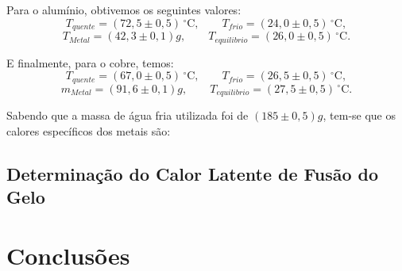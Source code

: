 \documentclass[12pt,a4paper]{article}
\begin{document}
Para o alumínio, obtivemos os seguintes valores:
$$ T_{quente} = (72,5 \pm 0,5)\,^{\circ}\mathrm{C}, \qquad T_{frio} = (24,0 \pm 0,5)\,^{\circ}\mathrm{C}, $$
$$ T_{Metal} = (42,3 \pm 0,1)g, \qquad T_{equilibrio} = (26,0 \pm 0,5)\,^{\circ}\mathrm{C}. $$


 E finalmente, para o cobre, temos:
$$ T_{quente} = (67,0 \pm 0,5)\,^{\circ}\mathrm{C}, \qquad T_{frio} = (26,5 \pm 0,5)\,^{\circ}\mathrm{C}, $$
$$ m_{Metal} = (91,6 \pm 0,1)g, \qquad T_{equilibrio} = (27,5 \pm 0,5)\,^{\circ}\mathrm{C}. $$

Sabendo que a massa de água fria utilizada foi de $(185 \pm 0,5)g$, tem-se que os calores específicos dos metais são:

\subsection{Determinação do Calor Latente de Fusão do Gelo}


\section{Conclusões}
\end{document}
